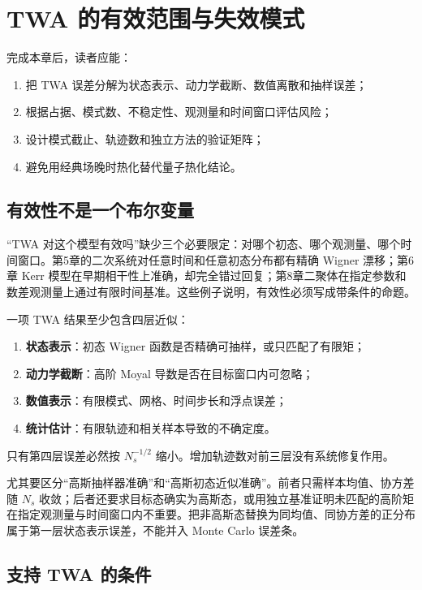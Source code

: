 \chapter{TWA 的有效范围与失效模式}
\label{ch:validity}

\begin{learningobjectives}
完成本章后，读者应能：
\begin{enumerate}
  \item 把 TWA 误差分解为状态表示、动力学截断、数值离散和抽样误差；
  \item 根据占据、模式数、不稳定性、观测量和时间窗口评估风险；
  \item 设计模式截止、轨迹数和独立方法的验证矩阵；
  \item 避免用经典场晚时热化替代量子热化结论。
\end{enumerate}
\end{learningobjectives}

\section{有效性不是一个布尔变量}

“TWA 对这个模型有效吗”缺少三个必要限定：对哪个初态、哪个观测量、哪个时间窗口。第5章的二次系统对任意时间和任意初态分布都有精确 Wigner 漂移；第6章 Kerr 模型在早期相干性上准确，却完全错过回复；第8章二聚体在指定参数和数差观测量上通过有限时间基准。这些例子说明，有效性必须写成带条件的命题。

一项 TWA 结果至少包含四层近似：
\begin{enumerate}
  \item \textbf{状态表示}：初态 Wigner 函数是否精确可抽样，或只匹配了有限矩；
  \item \textbf{动力学截断}：高阶 Moyal 导数是否在目标窗口内可忽略；
  \item \textbf{数值表示}：有限模式、网格、时间步长和浮点误差；
  \item \textbf{统计估计}：有限轨迹和相关样本导致的不确定度。
\end{enumerate}
只有第四层误差必然按 $N_s^{-1/2}$ 缩小。增加轨迹数对前三层没有系统修复作用。

尤其要区分“高斯抽样器准确”和“高斯初态近似准确”。前者只需样本均值、协方差随 $N_s$ 收敛；后者还要求目标态确实为高斯态，或用独立基准证明未匹配的高阶矩在指定观测量与时间窗口内不重要。把非高斯态替换为同均值、同协方差的正分布属于第一层状态表示误差，不能并入 Monte Carlo 误差条。

\section{支持 TWA 的条件}

